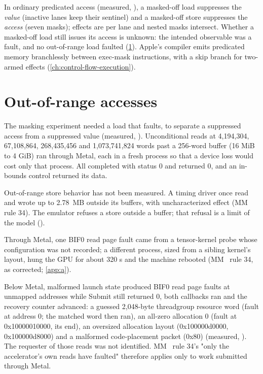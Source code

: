 In ordinary predicated access (measured, ), a masked-off load suppresses the \emph{value} (inactive
lanes keep their sentinel) and a masked-off store suppresses the \emph{access} (seven masks); effects are per lane and nested
masks intersect. Whether a masked-off load still issues its access is unknown: the intended observable was a fault,
and no out-of-range load faulted (\cref{sec:out-of-range-accesses-observed}). Apple's compiler emits predicated
memory branchlessly between exec-mask instructions, with a skip branch for two-armed effects (\cref{ch:control-flow-execution}).

\section{Out-of-range accesses}\label{sec:out-of-range-accesses-observed}

The masking experiment needed a load that faults, to separate a suppressed access from a suppressed value (measured,
 ). Unconditional  reads at
4,194,304, 67,108,864, 268,435,456 and 1,073,741,824 words past a 256-word buffer (16 MiB to 4 GiB) ran through Metal,
each in a fresh process so that a device loss would cost only that process. All completed with status 0 and returned 0,
and an in-bounds control returned its data.

Out-of-range store behavior has not been measured. A timing driver once read and wrote up to 2.78~MB
outside its buffers, with uncharacterized effect (MM~ rule 34). The emulator refuses a store outside a buffer; that
refusal is a limit of the model ().

Through Metal, one BIF0 read page fault came from a  tensor-kernel probe whose configuration was not
recorded; a different process, sized from a sibling kernel's layout, hung the GPU for about 320 s and the machine
rebooted (MM~ rule 34, as corrected; \cref{app:a}).

Below Metal, malformed launch state produced BIF0 read page faults at unmapped addresses while Submit still returned
0, both callbacks ran and the recovery counter advanced: a guessed 2,048-byte threadgroup resource word (fault at
address 0; the matched word then ran), an all-zero allocation 0 (fault at 0x10000010000, its end), an oversized
allocation layout (0x100000d0000, 0x100000d8000) and a malformed code-placement packet (0x80) (measured,
). The requester of those reads was not identified. MM~ rule 34's "only the
accelerator's own reads have faulted" therefore applies only to work submitted through Metal.

